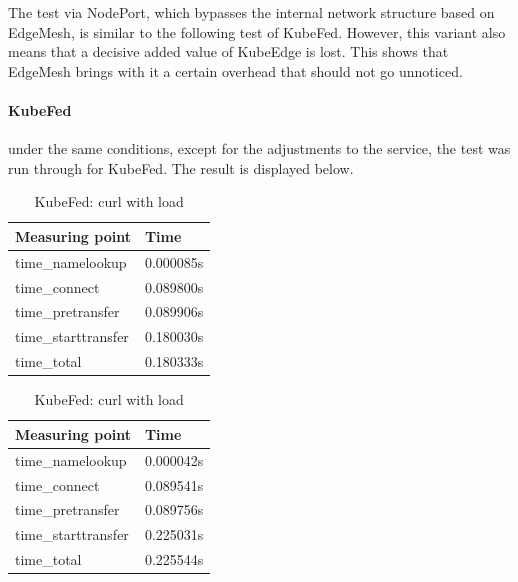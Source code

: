 \documentclass[MSC,Master,english]{twbook}%
\begin{document}
The test via NodePort, which bypasses the internal network structure based on EdgeMesh, is similar to the following test of KubeFed. However, this variant also means that a decisive added value of KubeEdge is lost. This shows that EdgeMesh brings with it a certain overhead that should not go unnoticed.

\paragraph{KubeFed} under the same conditions, except for the adjustments to the service, the test was run through for KubeFed. The result is displayed below.

\begin{table}[ht]
    \begin{center}
        \begin{minipage}{.49\linewidth}
            \begin{center}
                \begin{tabular}{|l|l|}
                    \hline
                    Measuring point & Time \\
                    \hline
                    time\_namelookup & 0.000085s \\
                    time\_connect & 0.089800s \\
                    time\_pretransfer & 0.089906s \\
                    time\_starttransfer & 0.180030s \\
                    \hline
                    time\_total & 0.180333s \\
                    \hline
                \end{tabular}
                \caption{KubeFed: curl without load}
                \label{tab:kf-con-noload}
            \end{center}
        \end{minipage}
        \begin{minipage}{.49\linewidth}
            \begin{center}
                \begin{tabular}{|l|l|}
                    \hline
                    Measuring point & Time \\
                    \hline
                    time\_namelookup & 0.000042s \\
                    time\_connect & 0.089541s \\
                    time\_pretransfer & 0.089756s \\
                    time\_starttransfer & 0.225031s \\
                    \hline
                    time\_total & 0.225544s \\
                    \hline
                \end{tabular}
                \caption{KubeFed: curl with load}
                \label{tab:kf-con-load}
            \end{center}
        \end{minipage}
    \end{center}
\end{table}
\end{document}
